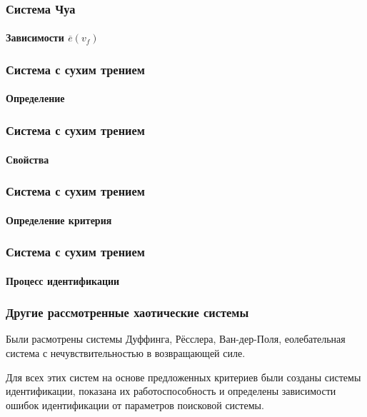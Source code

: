 \documentclass[10pt,utf8]{beamer}
\begin{document}
\begin{frame}
  \frametitle{Система Чуа}
  \framesubtitle{Зависимости $\overline{e}(v_f)$}


\end{frame}




\begin{frame}
  \frametitle{Система с сухим трением}
  \framesubtitle{Определение}

\end{frame}



\begin{frame}
  \frametitle{Система с сухим трением}
  \framesubtitle{Свойства}

\end{frame}


\begin{frame}
  \frametitle{Система с сухим трением}
  \framesubtitle{Определение критерия}

\end{frame}



\begin{frame}
  \frametitle{Система с сухим трением}
  \framesubtitle{Процесс идентификации}

\end{frame}






\begin{frame}
  \frametitle{Другие рассмотренные хаотические системы}

  Были расмотрены системы Дуффинга, Рёсслера, Ван-дер-Поля,
  еолебательная система с нечувствительностью в возвращающей силе.

  Для всех этих систем на основе предложенных критериев были
  созданы системы идентификации, показана их работоспособность
  и определены зависимости ошибок идентификации от параметров поисковой системы.


\end{frame}
\end{document}
